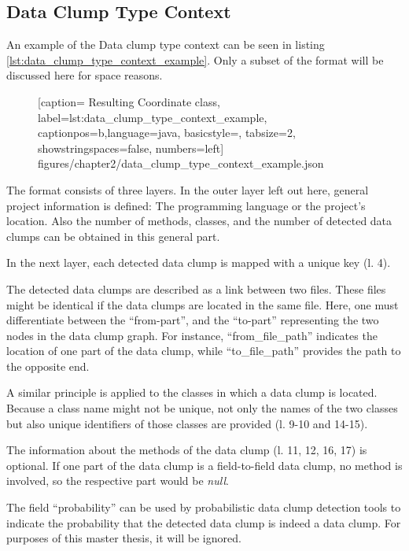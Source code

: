 
\renewcommand\appendixpagename{Appendix}
\begin{appendices}
\chapter{Data Clump Type Context}
\label{sec:data_clump_format}
An example of the Data clump type context can be seen in listing \ref{lst:data_clump_type_context_example}. Only a subset of the format will be discussed here for space reasons.

  \begin{figure} [htbp!]
			
			[caption={ Resulting Coordinate class},
			label={lst:data_clump_type_context_example},
			captionpos=b,language=java, basicstyle=\footnotesize, tabsize=2, showstringspaces=false,  numbers=left]
			{figures/chapter2/data_clump_type_context_example.json}
		\end{figure}

The format consists of three layers. In the outer layer left out here, general project information is defined: The programming language or the project's location. Also the number of methods, classes, and the number of detected data clumps can be obtained in this general part. 

In the next layer, each detected data clump is mapped with a unique key (l. 4).

The detected data clumps are described as a link between two files. These files might be identical if the data clumps are located in the same file. Here, one must differentiate between the \enquote{from-part}, and the \enquote{to-part} representing the two nodes in the data clump graph. For instance, \enquote{from\_file\_path} indicates the location of one part of the data clump, while \enquote{to\_file\_path} provides the path to the opposite end. 

A similar principle is applied to the classes in which a data clump is located. Because a class name might not be unique, not only the names of the two classes but also unique identifiers of those classes are provided (l. 9-10 and 14-15).

The information about the methods of the data clump (l. 11, 12, 16, 17) is optional. If one part of the data clump is a field-to-field data clump, no method is involved, so the respective part would be \textit{null}.

The field \enquote{probability} can be used by probabilistic data clump detection tools to indicate the probability that the detected data clump is indeed a data clump. For purposes of this master thesis, it will be ignored. 


\end{appendices}
